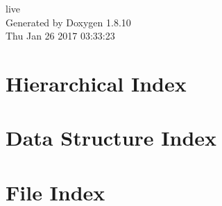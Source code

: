 \documentclass[twoside]{book}
\newcommand{\+}{\discretionary{\mbox{\scriptsize$\hookleftarrow$}}{}{}}
\newcommand{\clearemptydoublepage}{%
  \newpage{\pagestyle{empty}\cleardoublepage}%
}
\begin{document}
\begin{titlepage}
\vspace*{7cm}
\begin{center}%
{\Large live }\\
\vspace*{1cm}
{\large Generated by Doxygen 1.8.10}\\
\vspace*{0.5cm}
{\small Thu Jan 26 2017 03:33:23}\\
\end{center}
\end{titlepage}
\clearemptydoublepage
\tableofcontents
\clearemptydoublepage
{}

\chapter{Hierarchical Index}

\chapter{Data Structure Index}

\chapter{File Index}

\end{document}

